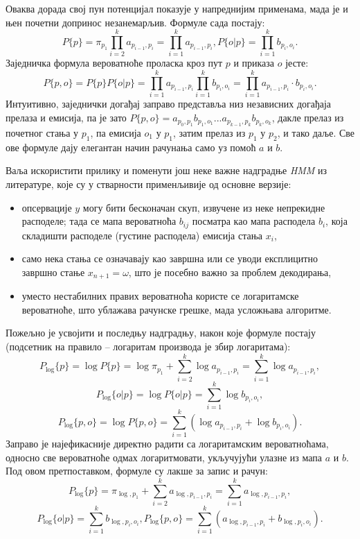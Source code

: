 \documentclass[12pt,oneside]{memoir}
\begin{document}
\begin{CJK}{UTF8}{ipxm}
Оваква дорада свој пун потенцијал показује у напреднијим применама, мада је и њен почетни допринос незанемарљив. Формуле сада постају: $$P\{p\} = \pi_{p_1} \prod_{i=2}^k a_{p_{i-1}, p_i} = \prod_{i=1}^k a_{p_{i-1}, p_i}, P\{o | p\} = \prod_{i=1}^k b_{p_i, o_i}.$$ Заједничка формула вероватноће проласка кроз пут $p$ и приказа $o$ јесте: $$P\{p, o\} = P\{p\} P\{o | p\} = \prod_{i=1}^k a_{p_{i-1}, p_i} \prod_{i=1}^k b_{p_i, o_i} = \prod_{i=1}^k a_{p_{i-1}, p_i} \cdot b_{p_i, o_i}.$$ Интуитивно, заједнички догађај заправо представља низ независних догађаја прелаза и емисија, па је зато $P\{p, o\} = a_{p_0, p_1} b_{p_1, o_1} ... a_{p_{k-1}, p_k} b_{p_k, o_k}$, дакле прелаз из почетног стања у $p_1$, па емисија $o_1$ у $p_1$, затим прелаз из $p_1$ у $p_2$, и тако даље. Све ове формуле дају елегантан начин рачунања само уз помоћ $a$ и $b$.

Ваља искористити прилику и поменути још неке важне надградње \textit{HMM} из литературе, које су у стварности применљивије од основне верзије:
\begin{itemize}
  \item опсервације $y$ могу бити бесконачан скуп, извучене из неке непрекидне расподеле; тада се мапа вероватноћа $b_{ij}$ посматра као мапа расподела $b_i$, која складишти расподеле (густине расподела) емисија стања $x_i$,
  \item само нека стања се означавају као завршна или се уводи експлицитно завршно стање $x_{n+1} = \omega$, што је посебно важно за проблем декодирања,
  \item уместо нестабилних правих вероватноћа користе се логаритамске вероватноће, што ублажава рачунске грешке, мада усложњава алгоритме.
\end{itemize}

Пожељно је усвојити и последњу надградњу, након које формуле постају (подсетник на правило -- логаритам производа је збир логаритама): $$P_{\log}\{p\} = \log P\{p\} = \log \pi_{p_1} + \sum_{i=2}^k \log a_{p_{i-1}, p_i} = \sum_{i=1}^k \log a_{p_{i-1}, p_i},$$ $$P_{\log}\{o | p\} = \log P\{o | p\} = \sum_{i=1}^k \log b_{p_i, o_i},$$ $$P_{\log}\{p, o\} = \log P\{p, o\} = \sum_{i=1}^k (\log a_{p_{i-1}, p_i} + \log b_{p_i, o_i}).$$ Заправо је најефикасније директно радити са логаритамским вероватноћама, односно све вероватноће одмах логаритмовати, укључујући улазне из мапа $a$ и $b$. Под овом претпоставком, формуле су лакше за запис и рачун: $$P_{\log}\{p\} = \pi_{\log, p_1} + \sum_{i=2}^k a_{\log, p_{i-1}, p_i} = \sum_{i=1}^k a_{\log, p_{i-1}, p_i},$$ $$P_{\log}\{o | p\} = \sum_{i=1}^k b_{\log, p_i, o_i}, P_{\log}\{p, o\} = \sum_{i=1}^k (a_{\log, p_{i-1}, p_i} + b_{\log, p_i, o_i}).$$


\end{CJK}
\end{document}

